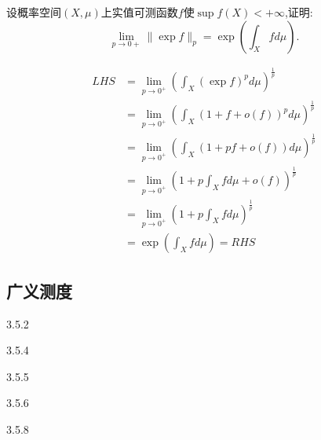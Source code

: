 \begin{6}
设概率空间$(X,\mu)$上实值可测函数$f$使$\sup f(X)<+\infty$,证明:
\begin{equation*}
    \lim_{p\to0+}\|\exp f\|_{p}=\exp\left(\int_{X}fd\mu\right).
\end{equation*}
   \end{6}
\begin{solution}

    \begin{align*}
        LHS&= \lim_{p\to 0^+} \left(\int_X(\exp f)^pd\mu\right)^{\frac{1}{p}}\\
        &= \lim_{p\to 0^+} \left(\int_X\left(1+f+o(f)\right)^pd\mu\right)^{\frac{1}{p}}\\
        &= \lim_{p\to 0^+} \left(\int_X(1+pf+o(f))d\mu\right)^{\frac{1}{p}}\\
        &= \lim_{p\to 0^+} \left(1+p\int_Xfd\mu+o(f)\right)^{\frac{1}{p}}\\
        &= \lim_{p\to 0^+} \left(1+p\int_Xfd\mu\right)^{\frac{1}{p}}\\
        &=\exp\left(\int_{X}fd\mu\right)=RHS
    \end{align*}
\end{solution}


\subsection{广义测度}
  {3.5.2}

   
\begin{solution}

\end{solution}



  {3.5.4}

   
\begin{solution}

\end{solution}


  {3.5.5}

   
\begin{solution}

\end{solution}


  {3.5.6}

   
\begin{solution}

\end{solution}



  {3.5.8}

